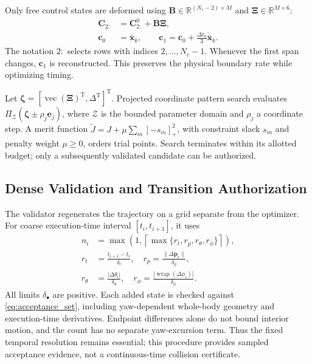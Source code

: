 \documentclass[journal,twoside]{IEEEtran}
\newcommand{\wrap}{\operatorname{wrap}}
\begin{document}
Only free control states are deformed using $\mathbf B\in\mathbb R^{(N_c-2)\times M}$ and $\boldsymbol\Xi\in\mathbb R^{M\times6}$:
\begin{equation}
\begin{aligned}
\mathbf C_{2:}&=\mathbf C^0_{2:}+\mathbf B\boldsymbol\Xi,\\
\mathbf c_0&=\bar{\mathbf x}_k,\qquad
\mathbf c_1=\mathbf c_0+\frac{\Delta t_0}{3}\dot{\bar{\mathbf x}}_k.
\end{aligned}
\label{eq:local_basis}
\end{equation}
The notation $2:$ selects rows with indices $2,\ldots,N_c-1$. Whenever the first span changes, $\mathbf c_1$ is reconstructed. This preserves the physical boundary rate while optimizing timing.

Let $\boldsymbol\zeta=[\operatorname{vec}(\boldsymbol\Xi)^{\mathrm T},\Delta^{\mathrm T}]^{\mathrm T}$. Projected coordinate pattern search evaluates $\Pi_{\mathcal Z}(\boldsymbol\zeta\pm\rho_j\mathbf e_j)$, where $\mathcal Z$ is the bounded parameter domain and $\rho_j$ a coordinate step. A merit function $\widetilde J=J+\mu\sum_m[-s_m]_+^2$, with constraint slack $s_m$ and penalty weight $\mu\ge0$, orders trial points. Search terminates within its allotted budget; only a subsequently validated candidate can be authorized.

\subsection{Dense Validation and Transition Authorization}
The validator regenerates the trajectory on a grid separate from the optimizer. For coarse execution-time interval $[t_i,t_{i+1}]$, it uses
\begin{equation}
\begin{aligned}
n_i&=\max\!\left(1,\left\lceil\max\{r_t,r_p,r_\theta,r_\phi\}\right\rceil\right),\\
r_t&=\frac{t_{i+1}-t_i}{\delta_t},\quad
r_p=\frac{\|\Delta\mathbf p_i\|}{\delta_p},\\
r_\theta&=\frac{|\Delta\theta_i|}{\delta_\theta},\quad
r_\phi=\frac{|\wrap(\Delta\phi_i)|}{\delta_\phi}.
\end{aligned}
\label{eq:validation}
\end{equation}
All limits $\delta_\bullet$ are positive. Each added state is checked against \eqref{eq:acceptance_set}, including yaw-dependent whole-body geometry and execution-time derivatives. Endpoint differences alone do not bound interior motion, and the count has no separate yaw-excursion term. Thus the fixed temporal resolution remains essential; this procedure provides sampled acceptance evidence, not a continuous-time collision certificate.
\end{document}
